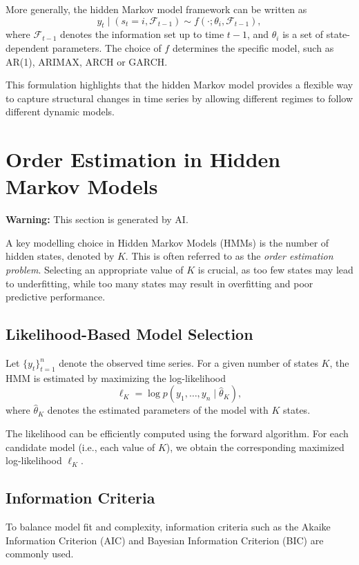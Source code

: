 \documentclass[11pt]{article}
\begin{document}
More generally, the hidden Markov model framework can be written as
$$
y_t \mid (s_t = i, \mathcal{F}_{t-1}) \sim f(\cdot; \theta_i, \mathcal{F}_{t-1}),
$$
where $\mathcal{F}_{t-1}$ denotes the information set up to time $t-1$, and 
$\theta_i$ is a set of state-dependent parameters. The choice of $f$ determines 
the specific model, such as AR(1), ARIMAX, ARCH or GARCH.

This formulation highlights that the hidden Markov model provides a flexible 
way to capture structural changes in time series by allowing different regimes 
to follow different dynamic models.


\section{Order Estimation in Hidden Markov Models}

\begin{center}
\textbf{Warning:} This section is generated by AI.
\end{center}

A key modelling choice in Hidden Markov Models (HMMs) is the number of hidden states, denoted by $K$. This is often referred to as the \emph{order estimation problem}. Selecting an appropriate value of $K$ is crucial, as too few states may lead to underfitting, while too many states may result in overfitting and poor predictive performance.

\subsection{Likelihood-Based Model Selection}

Let $\{y_t\}_{t=1}^n$ denote the observed time series. For a given number of states $K$, the HMM is estimated by maximizing the log-likelihood
\[
\ell_K = \log p(y_1, \dots, y_n \mid \hat{\theta}_K),
\]
where $\hat{\theta}_K$ denotes the estimated parameters of the model with $K$ states.

The likelihood can be efficiently computed using the forward algorithm. For each candidate model (i.e., each value of $K$), we obtain the corresponding maximized log-likelihood $\ell_K$.

\subsection{Information Criteria}

To balance model fit and complexity, information criteria such as the Akaike Information Criterion (AIC) and Bayesian Information Criterion (BIC) are commonly used.
\end{document}
